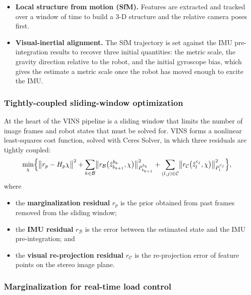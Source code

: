 \begin{itemize}[leftmargin=2em]
  \item \textbf{Local structure from motion (SfM).} Features are extracted and
    tracked over a window of time to build a 3-D structure and the relative
    camera poses first.
  \item \textbf{Visual-inertial alignment.} The SfM trajectory is set against
    the IMU pre-integration results to recover three initial quantities: the
    metric scale, the gravity direction relative to the robot, and the initial
    gyroscope bias, which gives the estimate a metric scale once the robot has
    moved enough to excite the IMU.
\end{itemize}

\subsubsection{Tightly-coupled sliding-window optimization}

At the heart of the VINS pipeline is a sliding window that limits the number of
image frames and robot states that must be solved for. VINS forms a nonlinear
least-squares cost function, solved with Ceres Solver, in which three residuals
are tightly coupled:
\begin{equation}
  \min_{\chi}\Bigl\{\bigl\lVert r_p - H_p\chi\bigr\rVert^2
  + \sum_{k\in\mathcal{B}}\bigl\lVert r_{\mathcal{B}}\bigl(\hat{z}^{b_k}_{b_{k+1}},\chi\bigr)\bigr\rVert^2_{P^{b_k}_{b_{k+1}}}
  + \sum_{(l,j)\in\mathcal{C}}\bigl\lVert r_{\mathcal{C}}\bigl(\hat{z}^{c_j}_l,\chi\bigr)\bigr\rVert^2_{P^{c_j}_l}\Bigr\},
  \label{eq:vins-cost}
\end{equation}
where
\begin{itemize}[leftmargin=2em]
  \item the \textbf{marginalization residual} $r_p$ is the prior obtained from
    past frames removed from the sliding window;
  \item the \textbf{IMU residual} $r_{\mathcal{B}}$ is the error between the
    estimated state and the IMU pre-integration; and
  \item the \textbf{visual re-projection residual} $r_{\mathcal{C}}$ is the
    re-projection error of feature points on the stereo image plane.
\end{itemize}

\subsubsection{Marginalization for real-time load control}

